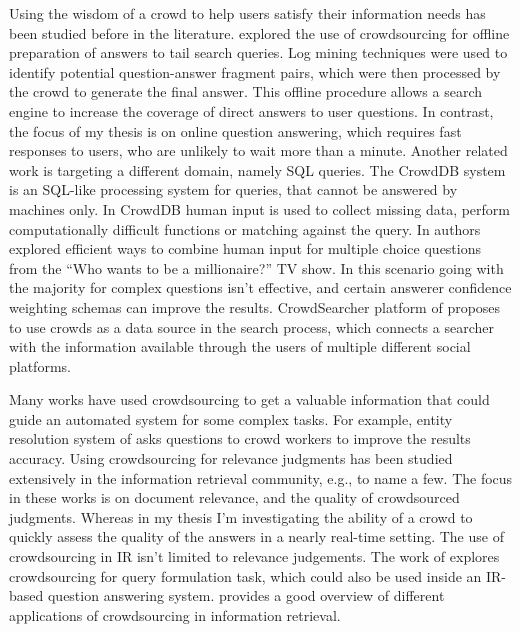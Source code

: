 Using the wisdom of a crowd to help users satisfy their information needs has been studied before in the literature.
\cite{bernstein2012direct} explored the use of crowdsourcing for offline preparation of answers to tail search queries.
Log mining techniques were used to identify potential question-answer fragment pairs, which were then processed by the crowd to generate the final answer.
This offline procedure allows a search engine to increase the coverage of direct answers to user questions.
In contrast, the focus of my thesis is on online question answering, which requires fast responses to users, who are unlikely to wait more than a minute.
Another related work is targeting a different domain, namely SQL queries.
The CrowdDB system~\cite{franklin2011crowddb} is an SQL-like processing system for queries, that cannot be answered by machines only.
In CrowdDB human input is used to collect missing data, perform computationally difficult functions or matching against the query.
In \cite{aydin2014crowdsourcing} authors explored efficient ways to combine human input for multiple choice questions from the ``Who wants to be a millionaire?'' TV show.
In this scenario going with the majority for complex questions isn't effective, and certain answerer confidence weighting schemas can improve the results.  
CrowdSearcher platform of \cite{Bozzon:2012:ASQ:2187836.2187971} proposes to use crowds as a data source in the search process, which connects a searcher with the information available through the users of multiple different social platforms.

Many works have used crowdsourcing to get a valuable information that could guide an automated system for some complex tasks.
For example, entity resolution system of \cite{Whang:2013:QSC:2536336.2536337} asks questions to crowd workers to improve the results accuracy.
Using crowdsourcing for relevance judgments has been studied extensively in the information retrieval community, e.g., \cite{Alonso:2008:CRE:1480506.1480508,alonso2011design,grady2010crowdsourcing} to name a few.
The focus in these works is on document relevance, and the quality of crowdsourced judgments.
Whereas in my thesis I'm investigating the ability of a crowd to quickly assess the quality of the answers in a nearly real-time setting.
The use of crowdsourcing in IR isn't limited to relevance judgements.
The work of \cite{harris2013comparing} explores crowdsourcing for query formulation task, which could also be used inside an IR-based question answering system.
\cite{lease2013crowdsourcing} provides a good overview of different applications of crowdsourcing in information retrieval.

